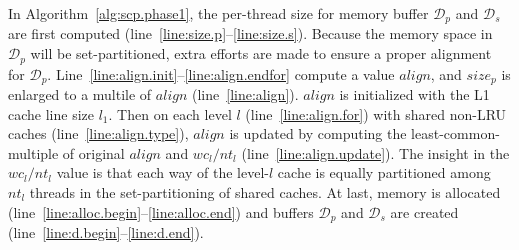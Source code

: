 In Algorithm~\ref{alg:scp.phase1},
the per-thread size for memory buffer $\mathcal{D}_p$ and
$\mathcal{D}_s$ are first computed
(line~\ref{line:size.p}--\ref{line:size.s}).
Because the memory space in $\mathcal{D}_p$ will be set-partitioned,
extra efforts are made to ensure a proper alignment for $\mathcal{D}_p$.
Line~\ref{line:align.init}--\ref{line:align.endfor} compute a value $align$,
and $size_p$ is enlarged to a multile of $align$ (line~\ref{line:align}).
$align$ is initialized with the L1 cache line size $l_1$.
Then on each level $l$ (line~\ref{line:align.for})
with shared non-LRU caches (line~\ref{line:align.type}),
$align$ is updated by computing the least-common-multiple of
original $align$ and $wc_l/nt_l$ (line~\ref{line:align.update}).
The insight in the $wc_l/nt_l$ value is that
each way of the level-$l$ cache is equally partitioned among $nt_l$ threads
in the set-partitioning of shared caches.
At last, memory is allocated (line~\ref{line:alloc.begin}--\ref{line:alloc.end})
and buffers $\mathcal{D}_p$ and $\mathcal{D}_s$
are created (line~\ref{line:d.begin}--\ref{line:d.end}).

